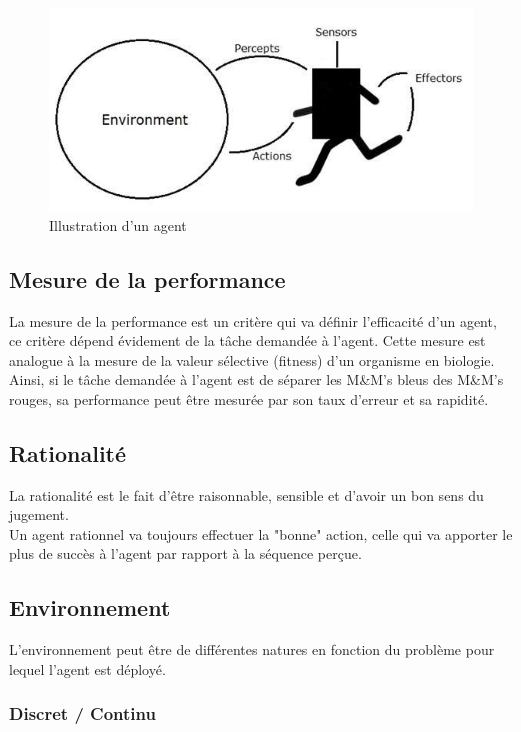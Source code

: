 \documentclass{article}
\begin{document}
\begin{figure}[H]
\begin{center}
	\includegraphics[scale=0.5]{agent_environment.jpg}
	\caption{Illustration d'un agent}
\end{center}
\end{figure}

\subsection{Mesure de la performance}

La mesure de la performance est un critère qui va définir l'efficacité d'un agent, ce critère dépend évidement de la tâche demandée à l'agent. Cette mesure est analogue à la mesure de la valeur sélective (fitness) d'un organisme en biologie. Ainsi, si le tâche demandée à l'agent est de séparer les M\&M's bleus des M\&M's rouges, sa performance peut être mesurée par son taux d'erreur et sa rapidité.

\subsection{Rationalité}

La rationalité est le fait d'être raisonnable, sensible et d'avoir un bon sens du jugement.\\
Un agent rationnel va toujours effectuer la "bonne" action, celle qui va apporter le plus de succès à l'agent par rapport à la séquence perçue\cite{tutoptai}.

\subsection{Environnement}

L'environnement peut être de différentes natures en fonction du problème pour lequel l'agent est déployé.

\subsubsection{Discret / Continu}
\end{document}

